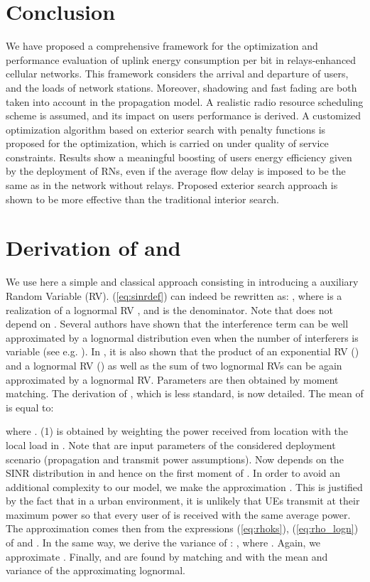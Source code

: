 \documentclass[draftcls,onecolumn]{IEEEtran}
\theoremstyle{plain}
\theoremstyle{definition}
\begin{document}
 


\section{Conclusion}\label{conclusions}



We have proposed a comprehensive framework for the optimization and performance evaluation of uplink energy consumption per bit in relays-enhanced cellular networks. This framework considers the arrival and departure of users, and the loads of network stations. Moreover, shadowing and fast fading are both taken into account in the propagation model. A realistic radio resource scheduling scheme is assumed, and its impact on users performance is derived. A customized optimization algorithm based on exterior search with penalty functions is proposed for the optimization, which is carried on under quality of service constraints. Results show a meaningful boosting of users energy efficiency given by the deployment of RNs, even if the average flow delay is imposed to be the same as in the network without relays. Proposed exterior search approach is shown to be more effective than the traditional interior search.  
\appendices


\section{Derivation of  and }\label{appendix:momentmatch}

We use here a simple and classical approach consisting in introducing a auxiliary Random Variable (RV). (\ref{eq:sinrdef}) can indeed be rewritten as: , where  is a realization of a lognormal RV , and  is the denominator. Note that  does not depend on . Several authors have shown that the interference term  can be well approximated by a lognormal distribution  even when the number of interferers is variable (see e.g. \cite{kostic, fischione}). In \cite{kostic}, it is also shown that the product of an exponential RV () and a lognormal RV () as well as the sum of two lognormal RVs can be again approximated by a lognormal RV. Parameters  are then obtained by moment matching. The derivation of , which is less standard, is now detailed.
The mean  of  is equal to:

where . (1) is obtained by weighting the power received from location  with the local load in . Note that  are input parameters of the considered deployment scenario (propagation and transmit power assumptions). Now  depends on the SINR distribution in  and hence on the first moment  of . In order to avoid an additional complexity to our model, we make the approximation . This is justified by the fact that in a urban environment, it is unlikely that UEs transmit at their maximum power \cite{bulakci13} so that every user of   is received with the same average power. The approximation comes then from the expressions (\ref{eq:rhoks}), (\ref{eq:rho_logn}) of  and . In the same way, we derive the variance  of : ,
where . Again, we approximate . Finally,  and  are found by matching  and  with the mean and variance of the approximating lognormal.
\end{document}
